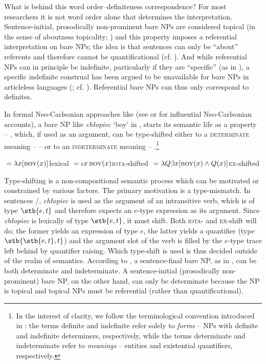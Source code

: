 \documentclass[output=paper]{langscibook}
\begin{document}
What is behind this word order--definiteness correspondence? For most researchers it is not word order alone that determines the interpretation. Sentence-initial, prosodically non-prominent bare NPs are considered topical (in the sense of aboutness topicality; \citealt{Reinhart1981}) and this property imposes a referential interpretation on bare NPs; the idea is that sentences can only be ``about'' referents and therefore cannot be quantificational (cf. \citealt{Endriss2009}). And while referential NPs can in principle be indefinite, particularly if they are ``specific'' (as in \citealt{Fodor.Sag1982}), a specific indefinite construal has been argued to be unavailable for bare NPs in articleless languages (\citealt{Dayal2004,Geist2010}; cf. \citealt{Borik2016,Borik.etal2020,Seres.Borik2020}). Referential bare NPs can thus only correspond to definites.

In formal Neo-Carlsonian approaches like  (see \citealt{Chierchia1998} or \citealt{Dayal2004} for influential Neo-Carlsonian accounts), a bare NP like \textit{chłopiec} `boy' in , starts its semantic life as a property -- , which, if used as an argument, can be type-shifted either to a \textsc{determinate} meaning --  -- or to an \textsc{indeterminate} meaning -- .\footnote{In the interest of clarity, we follow the terminological convention introduced in \citet{Coppock.Beaver2015}: the terms definite and indefinite refer solely to \textit{forms} -- NPs with definite and indefinite determiners, respectively, while the terms determinate and indeterminate refer to \textit{meanings} -- entities and existential quantifiers, respectively.}

\ea\ea {}${}=\lambda x[\textsc{boy}(x)]$\hfill lexical\label{sim-dem:ex:lex}
\ex {}${}=\iota x\,\textsc{boy}(x)$\hfill \textsc{iota-}shifted\label{sim-dem:ex:iota}
\ex {}${}=\lambda Q\exists x[\textsc{boy}(x)\wedge Q(x)]$\hfill \textsc{ex-}shifted\label{sim-dem:ex:ex}
\z\z

\noindent Type-shifting is a non-compositional semantic process which can be motivated or constrained by various factors. The primary motivation is a type-mismatch. In sentences /, \textit{chłopiec} is used as the argument of an intransitive verb, which is of type $\stb{e,t}$ and therefore expects an $e$-type expression as its argument. Since \textit{chłopiec} is lexically of type $\stb{e,t}$, it must shift. Both \textsc{iota}- and \textsc{ex}-shift will do; the former yields an expression of type $e$, the latter yields a quantifier (type $\stb{\stb{e,t},t}$) and the argument slot of the verb is filled by the $e$-type trace left behind by quantifier raising. Which type-shift is used is thus decided outside of the realm of semantics. According to \citet{Geist2010}, a sentence-final bare NP, as in , can be both determinate and indeterminate. A sentence-initial (prosodically non-prominent) bare NP, on the other hand, can only be determinate because the NP is topical and topical NPs must be referential (rather than quantificational).
\end{document}
